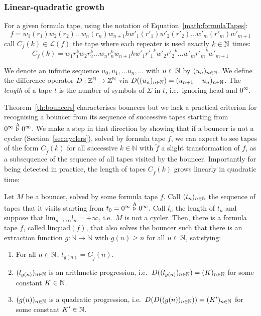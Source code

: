 \subsubsection{Linear-quadratic growth}

For a given formula tape, using the notation of Equation~\ref{math:formulaTapes}: $$f=w_1(r_1)w_2(r_2)\dots w_n(r_n) w_{n+1} h w'_1(r'_1)w'_2(r'_2)\dots w'_m(r'_m) w'_{m+1}$$ call $C_f(k) \in \mathcal{L}(f)$ the tape where each repeater is used exactly $k \in \mathbb{N}$ times: $$C_f(k)=w_1 r_1^k w_2 r_2^k\dots w_n r_n^k w_{n+1} h w'_1 {r'_1}^k w'_2 {r'_2}^k \dots w'_m {r'_m}^k w'_{m+1}$$

We denote an infinite sequence $u_0, u_1, \dots u_n, \dots$ with $n\in\mathbb{N}$ by $(u_n)_{n\in\mathbb{N}}$. We define the difference operator $D: \mathbb{Z}^{\mathbb{N}} \to \mathbb{Z}^{\mathbb{N}}$ via $D((u_n)_{n\in\mathbb{N}})=(u_{n+1}-u_{n})_{n\in\mathbb{N}}$. The \textit{length} of a tape $t$ is the number of symbols of $\Sigma$ in $t$, i.e.\ ignoring head and $0^\infty$.

Theorem~\ref{th:bouncers} characterises bouncers but we lack a practical criterion for recognising a bouncer from its sequence of successive tapes starting from $0^\infty \stackrel{\text{A}}\triangleright 0^\infty$. We make a step in that direction by showing that if a bouncer is not a cycler (Section~\ref{sec:cyclers}), solved by formula tape $f$, we can expect to see tapes of the form $C_{\tilde{f}}(k)$ for all successive $k\in\mathbb{N}$ with $\tilde{f}$ a slight transformation of $f$, as a subsequence of the sequence of all tapes visited by the bouncer. Importantly for being detected in practice, the length of tapes $C_{\tilde{f}}(k)$ grows linearly in quadratic time:

\begin{theorem}\label{th:linquad}
    Let $M$ be a bouncer, solved by some formula tape $f$. Call $(t_n)_{n\in\mathbb{N}}$ the sequence of tapes that it visits starting from $t_0 = 0^\infty \stackrel{\text{A}}\triangleright 0^\infty$. Call $l_n$ the length of $t_n$ and suppose that $\text{lim}_{n\to\infty} l_n = +\infty$, i.e.\ $M$ is not a cycler. Then, there is a formula tape $\tilde{f}$, called $\text{linquad}(f)$, that also solves the bouncer such that there is an extraction function $g: \mathbb{N} \to \mathbb{N}$ with $g(n) \geq n$ for all $n\in\mathbb{N}$, satisfying:

    \begin{enumerate}
        \item For all $n\in\mathbb{N}$, $t_{g(n)} = C_{\tilde{f}}(n)$.
        \item $(l_{g(n)})_{n\in\mathbb{N}}$ is an arithmetic progression, i.e.\ $D((l_{g(n)})_{n\in\mathbb{N}}) = (K)_{n\in\mathbb{N}}$ for some constant $K\in\mathbb{N}$.
        \item $(g(n))_{n\in\mathbb{N}}$ is a quadratic progression, i.e.\ $D(D((g(n))_{n\in\mathbb{N}})) = (K')_{n\in\mathbb{N}}$ for some constant $K'\in\mathbb{N}$.
    \end{enumerate}
\end{theorem}

